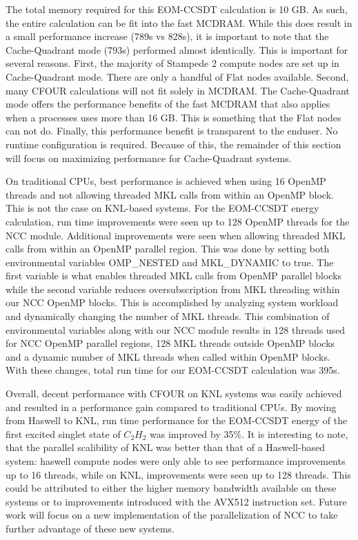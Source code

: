 The total memory required for this EOM-CCSDT calculation is 10 GB. As such, the entire calculation can
be fit into the fast MCDRAM. While this does result in a small performance increase (789s vs 828s), it is important
to note that the Cache-Quadrant mode (793s) performed almost identically. This is important for several reasons. First,
the majority of Stampede 2 compute nodes are set up in Cache-Quadrant mode. There are only a handful of Flat nodes
available. Second, many CFOUR calculations will not fit solely in MCDRAM. The Cache-Quadrant mode offers the
performance benefits of the fast MCDRAM that also applies when a processes uses more than 16 GB. This is something
that the Flat nodes can not do. Finally, this performance benefit is transparent to the enduser. No runtime
configuration is required. Because of this, the remainder of this section will focus on maximizing performance
for Cache-Quadrant systems.

On traditional CPUs, best performance is achieved when using 16 OpenMP threads and not allowing threaded MKL calls
from within an OpenMP block. This is not the case on KNL-based systems. For the EOM-CCSDT energy calculation,
run time improvements were seen up to 128 OpenMP threads for the NCC module. Additional improvements were seen
when allowing threaded MKL calls from within an OpenMP parallel region. This was done by setting both environmental
variables OMP\_NESTED and MKL\_DYNAMIC to true. The first variable is what enables threaded MKL calls from OpenMP
parallel blocks while the second variable reduces oversubscription from MKL threading within our NCC OpenMP blocks.
This is accomplished by analyzing system workload and dynamically changing the number of MKL threads. This
combination of environmental variables along with our NCC module results in 128 threads used for NCC OpenMP parallel
regions, 128 MKL threads outside OpenMP blocks and a dynamic number of MKL threads when called within OpenMP blocks.
With these changes, total run time for our EOM-CCSDT calculation was 395s.

Overall, decent performance with CFOUR on KNL systems was easily achieved and resulted in a performance
gain compared to traditional CPUs. By moving from Haswell to KNL, run time performance for the EOM-CCSDT energy
of the first excited singlet state of $C_2H_2$ was improved by 35\%. It is interesting to note, that the
parallel scalibility of KNL was better than that of a Haswell-based system: haswell compute nodes were only able
to see performance improvements up to 16 threads, while on KNL, improvements were seen up to 128 threads.
This could be attributed to either the higher memory bandwidth available on these systems or to improvements
introduced with the AVX512 instruction set. Future work will focus on a new implementation of the parallelization
of NCC to take further advantage of these new systems.
